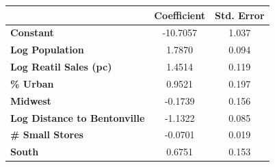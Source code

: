 \begin{center}
\begin{tabular}{lcc}
                                & \textbf{Coefficient} & \textbf{Std. Error}\\
\midrule
\textbf{Constant}                  &     -10.7057  &        1.037   \\
\textbf{Log Population}               &       1.7870  &        0.094 \\
\textbf{Log Reatil Sales (pc)} &       1.4514  &        0.119      \\
\textbf{\% Urban}             &       0.9521  &        0.197     \\
\textbf{Midwest}                &      -0.1739  &        0.156    \\
\textbf{Log Distance to Bentonville}        &      -1.1322  &        0.085    \\
\textbf{\# Small Stores}       &      -0.0701  &        0.019  \\
\textbf{South}                          &       0.6751  &        0.153    \\
\bottomrule
\end{tabular}
\end{center}
